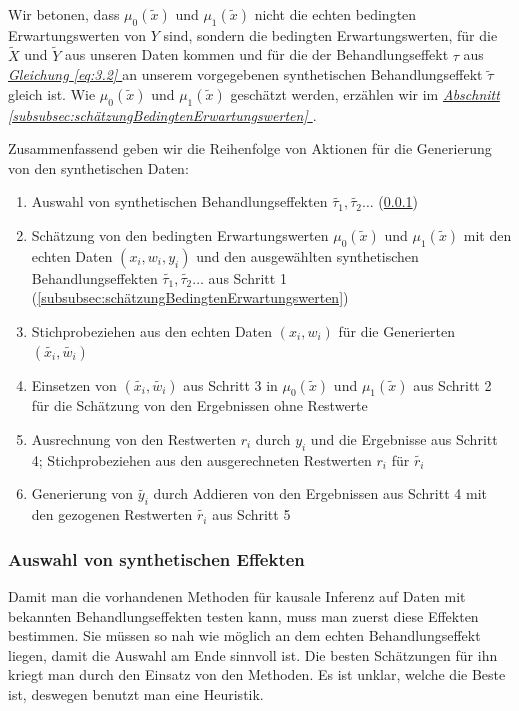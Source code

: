 \documentclass[12pt,a4paper,twoside]{scrartcl}
\numberwithin{equation}{section}
\newcommand{\refsec}[1]{\emph{\hyperref[#1]{Abschnitt \ref*{#1} }}}
\renewcommand*{\refeq}[1]{\emph{\hyperref[#1]{Gleichung \ref*{#1} }}}
\begin{document}
\noindent
Wir betonen, dass $\mu_0(\tilde{x})$ und $\mu_1(\tilde{x})$ nicht die echten bedingten Erwartungswerten von $Y$ sind, sondern die bedingten Erwartungswerten, für die $\widetilde{X}$ und $\widetilde{Y}$ aus unseren Daten kommen und für die der Behandlungseffekt $\tau$ aus \refeq{eq:3.2} an unserem vorgegebenen synthetischen Behandlungseffekt $\tilde{\tau}$ gleich ist. Wie $\mu_0(\tilde{x})$ und $\mu_1(\tilde{x})$ geschätzt werden, erzählen wir im \refsec{subsubsec:schätzungBedingtenErwartungswerten}.\par 

\noindent
Zusammenfassend geben wir die Reihenfolge von Aktionen für die Generierung von den synthetischen Daten:\par

\begin{enumerate}

\item Auswahl von synthetischen Behandlungseffekten $\tilde{\tau_1},\tilde{\tau_2}\dots$ (\ref{subsubsec:auswahlSynthEffekten}) 

\item Schätzung von den bedingten Erwartungswerten $\mu_0(\tilde{x})$ und $\mu_1(\tilde{x})$ mit den echten Daten $(x_i,w_i,y_i)$ und den ausgewählten synthetischen Behandlungseffekten $\tilde{\tau_1},\tilde{\tau_2}\dots$ aus Schritt 1  (\ref{subsubsec:schätzungBedingtenErwartungswerten})

\item Stichprobeziehen aus den echten Daten $(x_i,w_i)$ für die Generierten $(\tilde{x_i},\tilde{w_i})$ 

\item Einsetzen von $(\tilde{x_i},\tilde{w_i})$ aus Schritt 3 in $\mu_0(\tilde{x})$ und $\mu_1(\tilde{x})$ aus Schritt 2 für die Schätzung von den Ergebnissen ohne Restwerte

\item Ausrechnung von den Restwerten $r_i$ durch $y_i$ und die Ergebnisse aus Schritt 4; Stichprobeziehen aus den ausgerechneten Restwerten $r_i$ für $\tilde{r_i}$

\item Generierung von $\tilde{y_i}$ durch Addieren von den Ergebnissen aus Schritt 4 mit den gezogenen Restwerten $\tilde{r_i}$ aus Schritt 5

\end{enumerate}
  		\subsubsection{Auswahl von synthetischen Effekten}\label{subsubsec:auswahlSynthEffekten}
  		Damit man die vorhandenen Methoden für kausale Inferenz auf Daten mit bekannten Behandlungseffekten testen kann, muss man zuerst diese Effekten bestimmen. Sie müssen so nah wie möglich an dem echten Behandlungseffekt liegen, damit die Auswahl am Ende sinnvoll ist. Die besten Schätzungen für ihn kriegt man durch den Einsatz von den Methoden. Es ist unklar, welche die Beste ist, deswegen benutzt man eine Heuristik\cite{schuler2017synth}.\par 
  		
\end{document}
